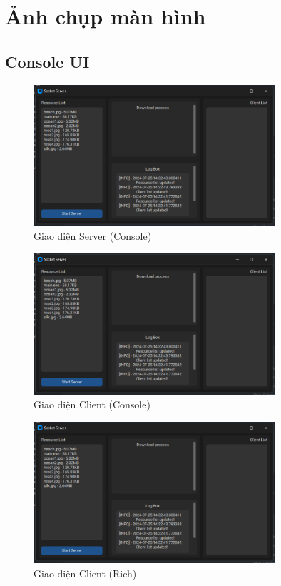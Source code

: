 \documentclass[a4paper,12pt]{report}
\begin{document}
\pagebreak
\section{Ảnh chụp màn hình}
\subsection{Console UI}
\begin{figure}[ht]
  \centering
  \includegraphics[width=0.8\textwidth]{Screenshots/server-gui.png}
  \caption{Giao diện Server (Console)}\label{fig:server-console}
\end{figure}
\begin{figure}[ht]
  \centering
  \includegraphics[width=0.8\textwidth]{Screenshots/server-gui.png}
  \caption{Giao diện Client (Console)}\label{fig:client-console}
\end{figure}
\begin{figure}[ht]
  \centering
  \includegraphics[width=0.8\textwidth]{Screenshots/server-gui.png}
  \caption{Giao diện Client (Rich)}\label{fig:client-rich}
\end{figure}
\end{document}
